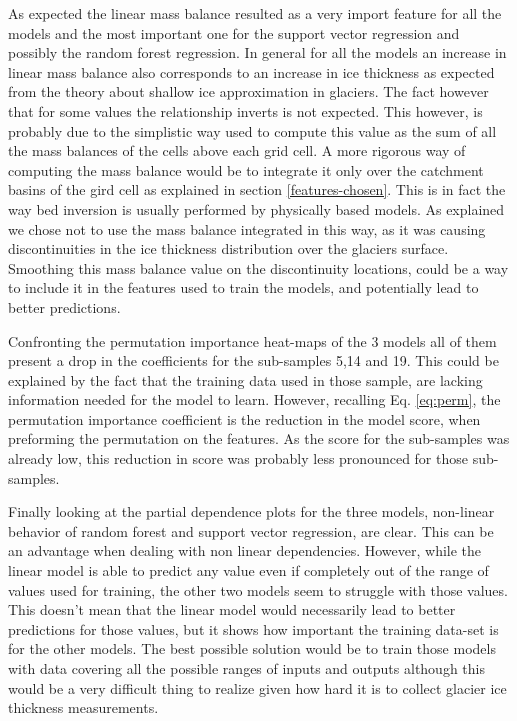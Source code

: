 As expected the linear mass balance resulted as a very import feature for all the models and the most important one for the support vector regression and possibly the random forest regression. In general for all the models an increase in linear mass balance also corresponds to an increase in ice thickness as expected from the theory about shallow ice approximation in glaciers. The fact however that for some values the relationship inverts is not expected. This however, is probably due to the simplistic way used to compute this value as the sum of all the mass balances of the cells above each grid cell. A more rigorous way of computing the mass balance would be to integrate it only over the catchment basins of the gird cell as explained in section \ref{features-chosen}. This is in fact the way bed inversion is usually performed by physically based models. As explained we chose not to use the mass balance integrated in this way, as it was causing discontinuities in the ice thickness distribution over the glaciers surface. Smoothing this mass balance value on the discontinuity locations, could be a way to include it in the features used to train the models, and potentially lead to better predictions. 

Confronting the permutation importance heat-maps of the 3 models all of them present a drop in the coefficients for the sub-samples 5,14 and 19. This could be explained by the fact that the training data used in those sample, are lacking information needed for the model to learn. However, recalling Eq. \ref{eq:perm}, the permutation importance coefficient is the reduction in the model score, when preforming the permutation on the features. As the score for the sub-samples was already low, this reduction in score was probably less pronounced for those sub-samples. 

Finally looking at the partial dependence plots for the three models, non-linear behavior of random forest and support vector regression, are clear. This can be an advantage when dealing with non linear dependencies. However, while the linear model is able to predict any value even if completely out of the range of values used for training, the other two models seem to struggle with those values. This doesn't mean that the linear model would necessarily lead to better predictions for those values, but it shows how important the training data-set is for the other models. The best possible solution would be to train those models with data covering all the possible ranges of inputs and outputs although this would be a very difficult thing to realize given how hard it is to collect glacier ice thickness measurements.

